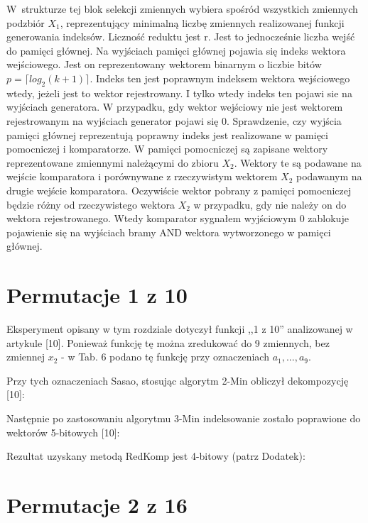 W~strukturze tej blok selekcji zmiennych wybiera spośród wszystkich zmiennych podzbiór $X_1$,
reprezentujący minimalną liczbę zmiennych realizowanej funkcji generowania indeksów.
Liczność reduktu jest r.
Jest to jednocześnie liczba wejść do pamięci głównej.
Na wyjściach pamięci głównej pojawia się indeks wektora wejściowego. %
Jest on reprezentowany wektorem binarnym o liczbie bitów $p = \lceil log_2 (k+1)\rceil$.
Indeks ten jest poprawnym indeksem wektora wejściowego wtedy,
jeżeli jest to wektor rejestrowany.
I tylko wtedy indeks ten pojawi sie na wyjściach generatora.
W przypadku,
gdy wektor wejściowy nie jest wektorem rejestrowanym na wyjściach generator pojawi się 0.
Sprawdzenie,
czy wyjścia pamięci głównej reprezentują poprawny indeks jest realizowane w pamięci pomocniczej i komparatorze.
W pamięci pomocniczej są zapisane wektory reprezentowane zmiennymi należącymi do zbioru $X_2$.
Wektory te są podawane na wejście komparatora i porównywane z rzeczywistym wektorem $X_2$ podawanym na drugie wejście komparatora.
Oczywiście wektor pobrany z pamięci pomocniczej będzie różny od rzeczywistego wektora $X_2$ w przypadku,
gdy nie należy on do wektora rejestrowanego.
Wtedy komparator sygnałem wyjściowym 0 zablokuje pojawienie się na wyjściach bramy AND wektora wytworzonego w pamięci głównej.

\section{Permutacje 1 z 10}

Eksperyment opisany w tym rozdziale dotyczył funkcji ,,1 z 10'' analizowanej w artykule [10].
Ponieważ funkcję tę można zredukować do 9 zmiennych,
bez zmiennej $x_2$ - w Tab. 6 podano tę funkcję przy oznaczeniach $a_1, ..., a_9$.

Przy tych oznaczeniach Sasao, stosując algorytm 2-Min obliczył dekompozycję [10]:

Następnie po zastosowaniu algorytmu 3-Min indeksowanie zostało poprawione do wektorów 5-bitowych [10]:

Rezultat uzyskany metodą RedKomp jest 4-bitowy (patrz Dodatek):

\section{Permutacje 2 z 16}

